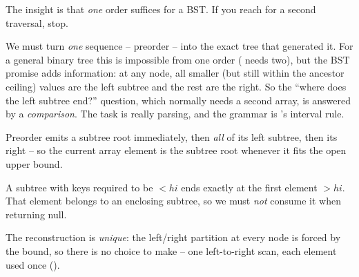 \begin{attemptgate}
The insight is that \emph{one} order suffices for a BST. If you reach for a second traversal, stop.
\end{attemptgate}

We must turn \emph{one} sequence -- preorder -- into the exact tree that generated it. For a general
binary tree this is impossible from one order ( needs two), but the BST
promise adds information: at any node, all smaller (but still within the ancestor ceiling) values are
the left subtree and the rest are the right. So the ``where does the left subtree end?'' question,
which normally needs a second array, is answered by a \emph{comparison}. The task is really parsing,
and the grammar is 's interval rule.

\begin{observation}
Preorder emits a subtree root immediately, then \emph{all} of its left subtree, then its right -- so
the current array element is the subtree root whenever it fits the open upper bound.
\end{observation}
\begin{observation}
A subtree with keys required to be $<\mathit{hi}$ ends exactly at the first element $>\mathit{hi}$.
That element belongs to an enclosing subtree, so we must \emph{not} consume it when returning null.
\end{observation}
\begin{observation}
The reconstruction is \emph{unique}: the left/right partition at every node is forced by the bound, so
there is no choice to make -- one left-to-right scan, each element used once ().
\end{observation}

